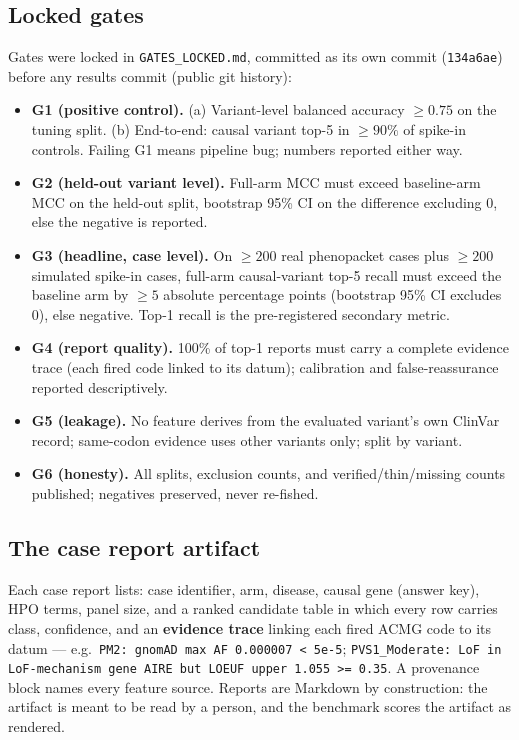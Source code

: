 \documentclass[11pt]{article}
\begin{document}
\subsection{Locked gates}
\label{sec:gates}
Gates were locked in \texttt{GATES\_LOCKED.md}, committed as its own commit
(\texttt{134a6ae}) before any results commit (public git history):
\begin{itemize}
\item \textbf{G1 (positive control).} (a) Variant-level balanced accuracy $\geq 0.75$
on the tuning split. (b) End-to-end: causal variant top-5 in $\geq 90\%$ of spike-in
controls. Failing G1 means pipeline bug; numbers reported either way.
\item \textbf{G2 (held-out variant level).} Full-arm MCC must exceed baseline-arm MCC
on the held-out split, bootstrap 95\% CI on the difference excluding 0, else the
negative is reported.
\item \textbf{G3 (headline, case level).} On $\geq 200$ real phenopacket cases plus
$\geq 200$ simulated spike-in cases, full-arm causal-variant top-5 recall must exceed
the baseline arm by $\geq 5$ absolute percentage points (bootstrap 95\% CI excludes
0), else negative. Top-1 recall is the pre-registered secondary metric.
\item \textbf{G4 (report quality).} 100\% of top-1 reports must carry a complete
evidence trace (each fired code linked to its datum); calibration and
false-reassurance reported descriptively.
\item \textbf{G5 (leakage).} No feature derives from the evaluated variant's own
ClinVar record; same-codon evidence uses other variants only; split by variant.
\item \textbf{G6 (honesty).} All splits, exclusion counts, and
verified/thin/missing counts published; negatives preserved, never re-fished.
\end{itemize}

\subsection{The case report artifact}
Each case report lists: case identifier, arm, disease, causal gene (answer key),
HPO terms, panel size, and a ranked candidate table in which every row carries
class, confidence, and an \textbf{evidence trace} linking each fired ACMG code to its
datum --- e.g.\ \texttt{PM2: gnomAD max AF 0.000007 < 5e-5}; \texttt{PVS1\_Moderate:
LoF in LoF-mechanism gene AIRE but LOEUF upper 1.055 >= 0.35}. A provenance block
names every feature source. Reports are Markdown by construction: the artifact is
meant to be read by a person, and the benchmark scores the artifact as rendered.
\end{document}
